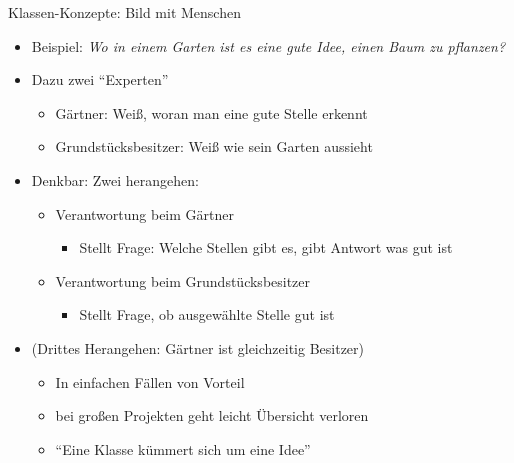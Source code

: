 \begin{frame}{Klassen-Konzepte: Bild mit Menschen}
%
\begin{itemize}
\item Beispiel: \emph{Wo in einem Garten ist es eine gute Idee, einen Baum zu pflanzen?}
\item Dazu zwei \enquote{Experten}
	\begin{itemize}
	\item Gärtner: Weiß, woran man eine gute Stelle erkennt
	\item Grundstücksbesitzer: Weiß wie sein Garten aussieht
	\end{itemize}
\item Denkbar: Zwei herangehen:
	\begin{itemize}
	\item Verantwortung beim Gärtner
		\begin{itemize}
		\item Stellt Frage: Welche Stellen gibt es, gibt Antwort was gut ist
		\end{itemize}
	\item Verantwortung beim Grundstücksbesitzer
		\begin{itemize}
		\item Stellt Frage, ob ausgewählte Stelle gut ist
		\end{itemize}
	\end{itemize}
\item (Drittes Herangehen: Gärtner ist gleichzeitig Besitzer)
	\begin{itemize}
	\item In einfachen Fällen von Vorteil
	\item bei großen Projekten geht leicht Übersicht verloren
	\item \enquote{Eine Klasse kümmert sich um eine Idee}
	\end{itemize}
\end{itemize}
%
\end{frame}


